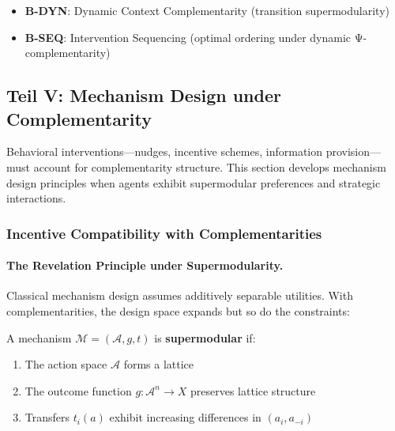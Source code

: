 \begin{itemize}
    \item \textbf{B-DYN}: Dynamic Context Complementarity (transition supermodularity)
    \item \textbf{B-SEQ}: Intervention Sequencing (optimal ordering under dynamic Ψ-complementarity)
\end{itemize}




\subsection{Teil V: Mechanism Design under Complementarity}
\label{sec:mechanism-design}

Behavioral interventions---nudges, incentive schemes, information provision---must 
account for complementarity structure. This section develops mechanism design 
principles when agents exhibit supermodular preferences and strategic interactions.

\subsubsection{Incentive Compatibility with Complementarities}

\paragraph{The Revelation Principle under Supermodularity.}

Classical mechanism design assumes additively separable utilities. With complementarities, 
the design space expands but so do the constraints:

\begin{definition}
\label{def:super-mechanism}
A mechanism $\mathcal{M} = (\mathcal{A}, g, t)$ is \textbf{supermodular} if:
\begin{enumerate}
    \item The action space $\mathcal{A}$ forms a lattice
    \item The outcome function $g: \mathcal{A}^n \to X$ preserves lattice structure
    \item Transfers $t_i(a)$ exhibit increasing differences in $(a_i, a_{-i})$
\end{enumerate}
\end{definition}

